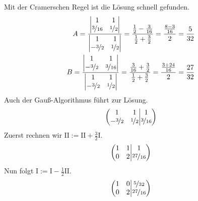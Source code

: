 \documentclass[11pt,a4paper,DIV=12]{scrartcl}
\begin{document}
Mit der Cramerschen Regel ist die Lösung schnell gefunden.
\begin{align}
	A = \frac{
		\begin{vmatrix}
			1 & 1\\
			\nicefrac{3}{16} & \nicefrac{1}{2}
	\end{vmatrix}}{
		\begin{vmatrix}
			1 & 1\\
			-\nicefrac{3}{2} & \nicefrac{1}{2}
	\end{vmatrix}}
	=\frac{\frac{1}{2}-\frac{3}{16}}{\frac{1}{2}+\frac{3}{2}}=\frac{\frac{8-3}{16}}{2}=\frac{5}{32}\\
	B=\frac{
		\begin{vmatrix}
			1 &  1\\
			-\nicefrac{3}{2} & \nicefrac{3}{16}
	\end{vmatrix}}{
		\begin{vmatrix}
			1 & 1\\
			-\nicefrac{3}{2} & \nicefrac{1}{2}
	\end{vmatrix}}=\frac{\frac{3}{16}+\frac{3}{2}}{\frac{1}{2}+\frac{3}{2}}=\frac{\frac{3+24}{16}}{2}=\frac{27}{32}
\end{align}
Auch der Gauß-Algorithmus führt zur Lösung.
\begin{gather}
	\left\lparen\begin{matrix}
		1 & 1 \\
		-\nicefrac{3}{2}&\nicefrac{1}{2}
	\end{matrix}
	\middle\vert
	\begin{matrix}
		1 \\
		\nicefrac{3}{16}
	\end{matrix}\right\rparen
\end{gather}
Zuerst rechnen wir $\mathrm{II}:=\mathrm{II}+\frac{3}{2}\mathrm{I}$.
\begin{gather}
	\left\lparen\begin{matrix}
		1 & 1 \\
		0&2
	\end{matrix}
	\middle\vert
	\begin{matrix}
		1 \\
		\nicefrac{27}{16}
	\end{matrix}\right\rparen
\end{gather}
Nun folgt $\mathrm{I}:=\mathrm{I}-\frac{1}{2}\mathrm{II}$.
\begin{gather}
	\left\lparen\begin{matrix}
		1 & 0 \\
		0&2
	\end{matrix}
	\middle\vert
	\begin{matrix}
		\nicefrac{5}{32} \\
		\nicefrac{27}{16}
	\end{matrix}\right\rparen
\end{gather}
\end{document}

